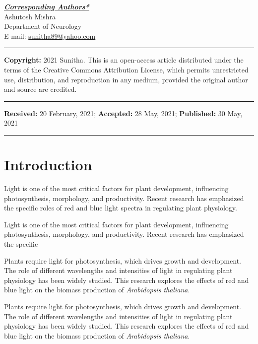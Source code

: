 \documentclass[10pt]{article} %
\begin{document}
\begin{multicols}{2}
\fontsize{9}{10.8}\selectfont\color{color_29791}

\begin{flushleft}
\color{color_100238}\textbf{\underline{\textit{Corresponding Authors*}}} \\
\vspace{0.3cm}
\color{color_29791}Ashutosh Mishra\\
\color{color_29791}Department of Neurology\\
E-mail: \href{mailto:sunitha89@yahoo.com}{sunitha89@yahoo.com}
\vspace{0.1cm}
\rule{\linewidth}{1pt}
\color{color_100238}\textbf{Copyright:} 
\color{color_29791} 2021 Sunitha. This is an open-access article distributed under the 
terms of the Creative Commons Attribution License, which permits unrestricted 
use, distribution, and reproduction in any medium, provided the original author 
and source are credited.
\vspace{0.1cm}
\rule{\linewidth}{1pt}
\color{color_29791}\textbf{Received:}  20 February, 2021;
\textbf{Accepted:} 28 May, 2021; 
\textbf{Published:} 30 May, 2021
\rule{\linewidth}{1pt}
\end{flushleft}



\section*{Introduction}
Light is one of the most critical factors for plant development, influencing photosynthesis, morphology, and productivity. Recent research has emphasized the specific roles of red and blue light spectra in regulating plant physiology.

Light is one of the most critical factors for plant development, influencing photosynthesis, morphology, and productivity. Recent research has emphasized the specific 

Plants require light for photosynthesis, which drives growth and development. The role of different wavelengths and intensities of light in regulating plant physiology has been widely studied. This research explores the effects of red and blue light on the biomass production of \textit{Arabidopsis thaliana}.


Plants require light for photosynthesis, which drives growth and development. The role of different wavelengths and intensities of light in regulating plant physiology has been widely studied. This research explores the effects of red and blue light on the biomass production of \textit{Arabidopsis thaliana}.


\end{multicols}
\end{document}
